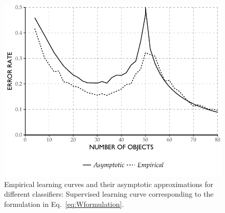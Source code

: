\documentclass[twoside]{memoir}\usepackage[]{graphicx}\usepackage{xcolor}
\makeatletter
\def\maxwidth{ %
  \ifdim\Gin@nat@width>\linewidth
    \linewidth
  \else
    \Gin@nat@width
  \fi
}
\newenvironment{knitrout}{}{} %
\makeatother
\begin{document}
\begin{knitrout}
\color{fgcolor}\begin{figure}
\includegraphics[width=\maxwidth]{figure/peaking-asymptotic-a-1} \caption{Empirical learning curves and their asymptotic approximations for different classifiers: Supervised learning curve corresponding to the formulation in Eq.~\eqref{eq:Wformulation}.}\label{fig:peaking-asymptotic-a}
\end{figure}


\end{knitrout}
\end{document}

